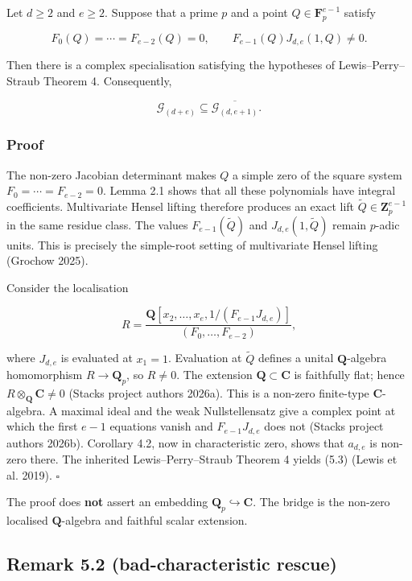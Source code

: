 \documentclass[
]{article}
\begin{document}
Let \(d\ge2\) and \(e\ge2\). Suppose that a prime \(p\) and a point
\(Q\in\mathbf F_p^{e-1}\) satisfy

\[
F_0(Q)=\cdots=F_{e-2}(Q)=0,
\qquad
F_{e-1}(Q)J_{d,e}(1,Q)\ne0.
\tag{5.2}
\]

Then there is a complex specialisation satisfying the hypotheses of
Lewis--Perry--Straub Theorem 4. Consequently,

\[
\mathcal G_{(d+e)}\subseteq
\overline{\mathcal G_{(d,e+1)}}.
\tag{5.3}
\]

\subsubsection*{Proof}\label{proof-5}

The non-zero Jacobian determinant makes \(Q\) a simple zero of the
square system \(F_0=\cdots=F_{e-2}=0\). Lemma 2.1 shows that all these
polynomials have integral coefficients. Multivariate Hensel lifting
therefore produces an exact lift \(\widetilde Q\in\mathbf Z_p^{e-1}\) in
the same residue class. The values \(F_{e-1}(\widetilde Q)\) and
\(J_{d,e}(1,\widetilde Q)\) remain \(p\)-adic units. This is precisely
the simple-root setting of multivariate Hensel lifting (Grochow 2025).

Consider the localisation

\[
R=\frac{
\mathbf Q[x_2,\ldots,x_e,
1/(F_{e-1}J_{d,e})]
}{(F_0,\ldots,F_{e-2})},
\tag{5.4}
\]

where \(J_{d,e}\) is evaluated at \(x_1=1\). Evaluation at
\(\widetilde Q\) defines a unital \(\mathbf Q\)-algebra homomorphism
\(R\to\mathbf Q_p\), so \(R\ne0\). The extension
\(\mathbf Q\subset\mathbf C\) is faithfully flat; hence
\(R\otimes_{\mathbf Q}\mathbf C\ne0\) (Stacks project authors 2026a).
This is a non-zero finite-type \(\mathbf C\)-algebra. A maximal ideal
and the weak Nullstellensatz give a complex point at which the first
\(e-1\) equations vanish and \(F_{e-1}J_{d,e}\) does not (Stacks project
authors 2026b). Corollary 4.2, now in characteristic zero, shows that
\(a_{d,e}\) is non-zero there. The inherited Lewis--Perry--Straub
Theorem 4 yields (5.3) (Lewis et al. 2019). \(\square\)

The proof does \textbf{not} assert an embedding
\(\mathbf Q_p\hookrightarrow
\mathbf C\). The bridge is the non-zero localised \(\mathbf Q\)-algebra
and faithful scalar extension.

\subsection*{Remark 5.2 (bad-characteristic
rescue)}\label{remark-5.2-bad-characteristic-rescue}
\end{document}
